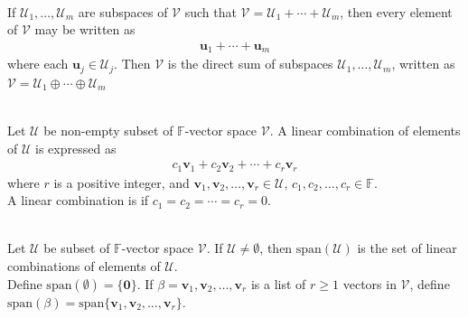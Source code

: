 \begin{definition} \\
If $\mathcal{U}_1, \ldots, \mathcal{U}_m$ are subspaces of $\mathcal{V}$ such that $\mathcal{V} = \mathcal{U}_1 + \cdots + \mathcal{U}_m$, then every element of $\mathcal{V}$ may be written as
\begin{align*}
\mathbf{u}_1 + \cdots + \mathbf{u}_m \nonumber
\end{align*}
where each $\mathbf{u}_j \in \mathcal{U}_j$. Then $\mathcal{V}$ is the direct sum of subspaces $\mathcal{U}_1, \ldots, \mathcal{U}_m$, written as $\mathcal{V} = \mathcal{U}_1 \oplus \cdots \oplus \mathcal{U}_m$
\end{definition}

\begin{definition} \\
Let $\mathcal{U}$ be non-empty subset of $\mathbb{F}$-vector space $\mathcal{V}$. A linear combination of elements of $\mathcal{U}$ is expressed as
\begin{align}
c_1 \mathbf{v}_1 + c_2 \mathbf{v}_2 + \cdots + c_r \mathbf{v}_r \nonumber
\end{align}
where $r$ is a positive integer, and $\mathbf{v}_1, \mathbf{v}_2, \ldots, \mathbf{v}_r \in \mathcal{U}$, $c_1, c_2, \ldots, c_r \in \mathbb{F}$.\\
A linear combination is  if $c_1 = c_2 = \cdots = c_r = 0$.
\end{definition}

\begin{definition} \\
Let $\mathcal{U}$ be subset of $\mathbb{F}$-vector space $\mathcal{V}$. If $\mathcal{U} \neq \emptyset$, then $\text{span}(\mathcal{U})$ is the set of linear combinations of elements of $\mathcal{U}$.\\
Define $\text{span}(\emptyset) = \{\mathbf{0}\}$. If $\beta = \mathbf{v}_1, \mathbf{v}_2, \ldots, \mathbf{v}_r$ is a list of $r \geq 1$ vectors in $\mathcal{V}$, define $\text{span}(\beta) = \text{span}\{ \mathbf{v}_1, \mathbf{v}_2, \ldots, \mathbf{v}_r \}$.
\end{definition}

